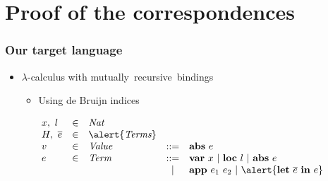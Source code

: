 \documentclass[professionalfont,dvipdfmx,cjk,xcolor=dvipsnames,envcountsect,notheorems,12pt]{beamer}
\theoremstyle{definition}
\newcommand{\keyword}[1]{\mathbf{#1}}
\newcommand{\LET}[2]{\keyword{let}~#1~\keyword{in}~#2}
\newcommand{\VAR}[1]{\keyword{var}~#1}
\newcommand{\LOC}[1]{\keyword{loc}~#1}
\newcommand{\ABS}[1]{\keyword{abs}~#1}
\newcommand{\APP}[2]{\keyword{app}~#1~#2}
\newcommand{\EVALNEED}[4]{\langle \textcolor{HeapBlue}{#1} \rangle \textcolor{TermGreen}{#2} \Downarrow_\mathtt{d} \langle \textcolor{HeapBlue}{#3} \rangle \textcolor{TermGreen}{#4}}
\newcommand{\DIVERGENEED}[2]{\langle \textcolor{HeapBlue}{#1} \rangle \textcolor{TermGreen}{#2}\Uparrow_\mathtt{d}}
\newcommand{\EVALNAMEHEAP}[4]{\langle \textcolor{HeapBlue'}{#1} \rangle \textcolor{TermGreen'}{#2} \Downarrow_\mathtt{m} \langle \textcolor{HeapBlue'}{#3} \rangle \textcolor{TermGreen'}{#4}}
\newcommand{\DIVERGENAMEHEAP}[2]{\langle \textcolor{HeapBlue'}{#1}\rangle \textcolor{TermGreen'}{#2}\Uparrow_\mathtt{m}}
\newcommand{\EVALNAMECLOS}[3]{\{\textcolor{EnvBlue}{#1} \} \textcolor{TermGreen}{#2} \Downarrow_\mathtt{m} \textcolor{ClosBlue}{#3}}
\newcommand{\DIVERGENAMECLOS}[2]{\{\textcolor{EnvBlue}{#1} \} \textcolor{TermGreen}{#2} \Uparrow_\mathtt{m}}
\newcommand{\EVALNAMESUBST}[2]{\textcolor{TermGreen}{#1} \Downarrow_\mathtt{m} \textcolor{TermGreen}{#2}}
\newcommand{\DIVERGENAMESUBST}[1]{\textcolor{TermGreen}{#1} \Uparrow_\mathtt{m}}
\newcommand\doubleplus{\mathbin{+\kern-1.3ex+\kern0.8ex\!\!}}
\newcommand{\CLOS}[2]{\keyword{cls}(#1,~#2)}
\newcommand{\HGET}[2]{#1(#2)}
\begin{document}



\section{Proof of the correspondences}

\begin{frame}
	\frametitle{Our target language}
	\begin{itemize}
		\item $\lambda$-calculus with \mbox{\alert{mutually recursive bindings}}
			\vspace{-7mm}
			\begin{itemize}
				\item Using de Bruijn indices
			\end{itemize}
	\end{itemize}
	\Large
	\[\begin{array}{lclcll}
		x,~l & \in & \textit{Nat} & & \\
		H,~\overline{e} & \in & \alert{\textit{Terms}} \\
		v & \in & \textit{Value} & ::= & \ABS{e} \\
		e & \in & \textit{Term} & ::= & \VAR{x}~|~\LOC{l}~|~\ABS{e} \\
		& & & | & \APP{e_1}{e_2}~|~\alert{\LET{\overline{e}}{e}} \\
	\end{array}\]
\end{frame}
\end{document}

